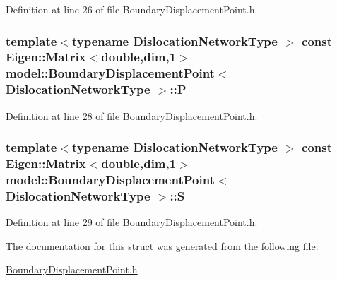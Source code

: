 Definition at line 26 of file Boundary\+Displacement\+Point.\+h.

\hypertarget{structmodel_1_1_boundary_displacement_point_af3affa7a82c35585750f37307fdf6494}{}
\subsubsection[{P}]{\setlength{\rightskip}{0pt plus 5cm}template$<$typename Dislocation\+Network\+Type $>$ const Eigen\+::\+Matrix$<$double,{\bf dim},1$>$ {\bf model\+::\+Boundary\+Displacement\+Point}$<$ Dislocation\+Network\+Type $>$\+::P}\label{structmodel_1_1_boundary_displacement_point_af3affa7a82c35585750f37307fdf6494}


Definition at line 28 of file Boundary\+Displacement\+Point.\+h.

\hypertarget{structmodel_1_1_boundary_displacement_point_a3df09dfc180e657ab0cd184f55a15100}{}
\subsubsection[{S}]{\setlength{\rightskip}{0pt plus 5cm}template$<$typename Dislocation\+Network\+Type $>$ const Eigen\+::\+Matrix$<$double,{\bf dim},1$>$ {\bf model\+::\+Boundary\+Displacement\+Point}$<$ Dislocation\+Network\+Type $>$\+::S}\label{structmodel_1_1_boundary_displacement_point_a3df09dfc180e657ab0cd184f55a15100}


Definition at line 29 of file Boundary\+Displacement\+Point.\+h.



The documentation for this struct was generated from the following file\+:\begin{DoxyCompactItemize}
\item 
\hyperlink{_boundary_displacement_point_8h}{Boundary\+Displacement\+Point.\+h}\end{DoxyCompactItemize}
